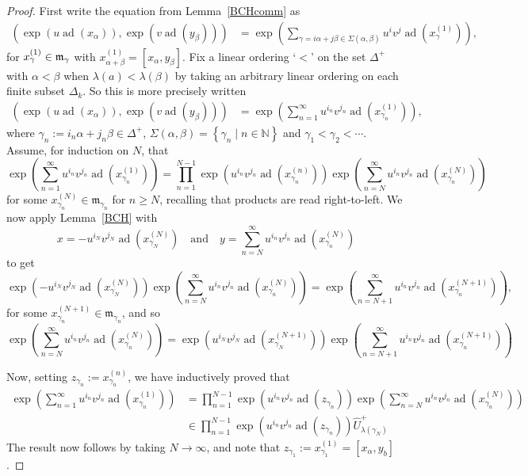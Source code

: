 \documentclass[11pt,letterpaper]{amsart}
\numberwithin{thecounter}{section}
\theoremstyle{definition}
\DeclareMathOperator{\ad}{ad}
\renewcommand{\a}{\alpha}
\renewcommand{\b}{\beta}
\newcommand{\g}{\gamma}
\newcommand{\N}{{\mathbb N}}
\begin{document}
\begin{longver}
\begin{proof} 
First write the equation from Lemma~\ref{BCHcomm}  as
\begin{align*}
 \left(\exp\left(u\ad\left(x_\a\right)\right),\exp\left(v\ad\left(y_\b\right)\right)\right) &= 
    \exp\left( \sum_{\g=i\a+j\b\in\Sigma(\a,\b)} u^i v^j\ad\left(x^{(1)}_{\g}\right) \right), 
\end{align*}
for $x^{(1)}_\g\in {\frak m}_{\g}$ with $x^{(1)}_{\a+\b}=\left[x_\a,y_\b\right]$.
Fix a linear ordering `$<$' on the set $\Delta^+$ with $\a<\b$ when $\lambda(a)<\lambda(\b)$ by taking an arbitrary linear ordering on each finite subset $\Delta_k$.
So this is more precisely written
\begin{align*}
\left(\exp\left(u\ad\left(x_\a\right)\right),\exp\left(v\ad\left(y_\b\right)\right)\right) &= 
    \exp\left( \sum_{n=1}^\infty u^{i_n} v^{j_n} \ad\left(x^{(1)}_{\g_n}\right) \right), 
\end{align*}
where $\g_n := i_n\a+j_n\b\in\Delta^+$, $\Sigma(\a,\b)=\left\{\g_n \mid n\in\N\right\}$ and $\g_1< \g_2<\cdots$.
Assume, for induction on $N$, that
$$\exp\left( \sum_{n=1}^\infty u^{i_n} v^{j_n} \ad\left(x^{(1)}_{\g_n}\right) \right) = 
  \prod_{n=1}^{N-1} \exp\left(u^{i_n} v^{j_n} \ad\left(x^{(n)}_{\g_n}\right)\right)
  \exp\left( \sum_{n=N}^\infty u^{i_n} v^{j_n} \ad\!\left(x^{(N)}_{\g_n}\right) \right)$$
for some $x^{(N)}_{\g_n} \in \mathfrak{m}_{\g_n}$ for $n\ge N$, recalling that products are read right-to-left.
We now apply Lemma~\ref{BCH} with
 $$x= - u^{i_N} v^{j_N} \ad\left(x^{(N)}_{\g_N}\right)\quad \text{and}\quad  
     y= \sum_{n=N}^\infty u^{i_n} v^{j_n} \ad\left(x^{(N)}_{\g_n}\right)$$ 
to get
$$\exp\left(- u^{i_N} v^{j_N} \ad\left(x^{(N)}_{\g_N}\right)\right) 
  \exp \left(\sum_{n=N}^\infty u^{i_n} v^{j_n} \ad\left(x^{(N)}_{\g_n}\right)\right) 
= \exp\left(\sum_{n=N+1}^\infty u^{i_n} v^{j_n} \ad\left(x^{(N+1)}_{\g_n}\right)\right), $$
for some $x^{(N+1)}_{\g_n} \in \mathfrak{m}_{\g_n}$,
and so
$$\exp\left(\sum_{n=N}^\infty u^{i_n} v^{j_n} \ad\left(x^{(N)}_{\g_n}\right)\right)  
  = \exp\left( u^{i_N} v^{j_N} \ad\left(x^{(N+1)}_{\g_N}\right)\right)
\exp\left(\sum_{n=N+1}^\infty u^{i_n} v^{j_n} \ad\left(x^{(N+1)}_{\g_n}\right)\right) $$

Now, setting $z_{\g_n}:= x^{(n)}_{\g_n}$, we have inductively proved that
\begin{align*}
  \exp\left( \sum_{n=1}^\infty u^{i_n} v^{j_n} \ad\left(x^{(1)}_{\g_n} \right) \right) 
    &= \prod_{n=1}^{N-1} \exp\left(u^{i_n} v^{j_n} \ad\left(z_{\g_n}\right)\right) \exp\left( \sum_{n=N}^\infty u^{i_n} v^{j_n} \ad\left(x^{(N)}_{\g_n}\right) \right)\\
    &\in  \prod_{n=1}^{N-1} \exp\left(u^{i_n} v^{j_n} \ad\left(z_{\g_n}\right)\right) \widehat{U}^+_{\lambda(\g_N)}
\end{align*}
The result now follows by taking $N\to\infty$, and note that $z_{\g_1}:= x^{(1)}_{\g_1}=\left[x_\a,y_b\right]$.
\end{proof}
\end{longver}
\end{document}
